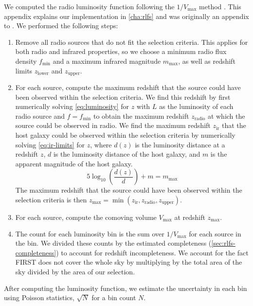   We computed the radio luminosity function following the $1/V_{\max}$ method
  \citep{schmidt1968vmax}. This appendix explains our implementation in \autoref{cha:rlfs} and was originally an appendix to \citet{alger21rlfs}. We performed the
  following steps:
  \begin{enumerate}
    \item Remove all radio sources that do not fit the selection criteria.
      This applies for both radio and infrared properties, so we choose a minimum radio flux density $f_{\min}$ and a maximum infrared magnitude
      $m_{\max}$, as well as redshift limits $z_{\mathrm{lower}}$ and $z_{\mathrm{upper}}$.
    \item For each source, compute the maximum redshift that the source could
      have been observed within the selection criteria. We find this redshift
      by first numerically solving \autoref{eq:luminosity} for $z$ with $L$ as
      the luminosity of each radio source and $f = f_{\min}$ to obtain the
      maximum redshift $z_\text{radio}$ at which the source could be observed
      in radio. We find the maximum redshift $z_{\text{ir}}$ that the host
      galaxy could be observed within the selection criteria by numerically
      solving \autoref{eq:ir-limits} for $z$, where $d(z)$ is the luminosity
      distance at a redshift $z$, $d$ is the luminosity distance of the host
      galaxy, and $m$ is the apparent magnitude of the host galaxy.
      \begin{equation}
        \label{eq:ir-limits}
        5 \log_{10}\left(\frac{d(z)}{d}\right) + m = m_{\max}
      \end{equation}
      The maximum redshift that the source could have been observed within the
      selection criteria is then $z_{\mathrm{max}} = \min(z_{\mathrm{ir}}, z_{\mathrm{radio}}, z_{\mathrm{upper}})$.
    \item For each source, compute the comoving volume $V_{\mathrm{max}}$ at
      redshift $z_{\mathrm{max}}$.
    \item The count for each luminosity bin is the sum over $1 / V_{\max}$ for
      each source in the bin. We divided these counts by the estimated completeness (\autoref{sec:rlfs-completeness}) to account for redshift incompleteness.
      We account for the fact FIRST does not cover the
      whole sky by multiplying by the total area of the sky divided by the area
      of our selection.
  \end{enumerate}

  After computing the luminosity function, we estimate the uncertainty in each bin using Poisson statistics, $\sqrt{N}$ for a bin count $N$.

